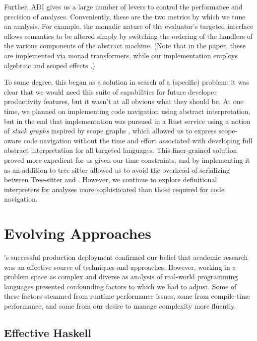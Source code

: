 \documentclass[acmsmall,fleqn,12pt]{acmart}
\begin{document}
Further, ADI gives us a large number of levers to control the performance and
precision of analyses. Conveniently, these are the two metrics by which we tune
an analysis. For example, the monadic nature of the evaluator's targeted
interface allows semantics to be altered simply by switching the ordering of the
handlers of the various components of the abstract machine. (Note that in the
paper, these are implemented via monad transformers, while our implementation
employs algebraic and scoped effects \cite{wu2014effect}.)

To some degree, this began as a solution in search of a (specific) problem: it
was clear that we would need this suite of capabilities for future developer
productivity features, but it wasn't at all obvious what they should be. At one
time, we planned on implementing code navigation using abstract interpretation,
but in the end that implementation was pursued in a Rust service using a notion
of \emph{stack graphs} \cite{creager21stackgraphs} inspired by scope graphs
\cite{visser18scopes}, which allowed us to express scope-aware code navigation
without the time and effort associated with developing full abstract
interpretation for all targeted languages. This finer-grained solution proved
more expedient for us given our time constraints, and by implementing it as an
addition to tree-sitter allowed us to avoid the overhead of serializing between
Tree-sitter and \semantic{}. However, we continue to explore definitional
interpreters for analyses more sophisticated than those required for code navigation.

\section{Evolving Approaches}
\label{sec:evolving}

\semantic's successful production deployment confirmed our belief that
academic research was an effective source of techniques and approaches. However,
working in a problem space as complex and diverse as analysis of real-world
programming languages presented confounding factors to which we had to adjust.
Some of these factors stemmed from runtime performance issues, some from
compile-time performance, and some from our desire to manage complexity more
fluently.

\subsection{Effective Haskell} \label{sec:effects}
\end{document}
